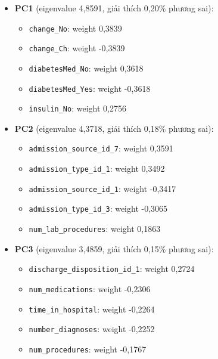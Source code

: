 \documentclass[a4paper]{report}
\begin{document}
\begin{itemize}
  \item \textbf{PC1} (eigenvalue 4,8591, giải thích 0,20\% phương sai):

\begin{itemize}
  \item \texttt{change\_\allowbreak{}No}: weight 0,3839
  \item \texttt{change\_\allowbreak{}Ch}: weight -0,3839
  \item \texttt{diabetesMed\_\allowbreak{}No}: weight 0,3618
  \item \texttt{diabetesMed\_\allowbreak{}Yes}: weight -0,3618
  \item \texttt{insulin\_\allowbreak{}No}: weight 0,2756
\end{itemize}

  \item \textbf{PC2} (eigenvalue 4,3718, giải thích 0,18\% phương sai):

\begin{itemize}
  \item \texttt{admission\_\allowbreak{}source\_\allowbreak{}id\_\allowbreak{}7}: weight 0,3591
  \item \texttt{admission\_\allowbreak{}type\_\allowbreak{}id\_\allowbreak{}1}: weight 0,3492
  \item \texttt{admission\_\allowbreak{}source\_\allowbreak{}id\_\allowbreak{}1}: weight -0,3417
  \item \texttt{admission\_\allowbreak{}type\_\allowbreak{}id\_\allowbreak{}3}: weight -0,3065
  \item \texttt{num\_\allowbreak{}lab\_\allowbreak{}procedures}: weight 0,1863
\end{itemize}

  \item \textbf{PC3} (eigenvalue 3,4859, giải thích 0,15\% phương sai):

\begin{itemize}
  \item \texttt{discharge\_\allowbreak{}disposition\_\allowbreak{}id\_\allowbreak{}1}: weight 0,2724
  \item \texttt{num\_\allowbreak{}medications}: weight -0,2306
  \item \texttt{time\_\allowbreak{}in\_\allowbreak{}hospital}: weight -0,2264
  \item \texttt{number\_\allowbreak{}diagnoses}: weight -0,2252
  \item \texttt{num\_\allowbreak{}procedures}: weight -0,1767
\end{itemize}


\end{itemize}
\end{document}
